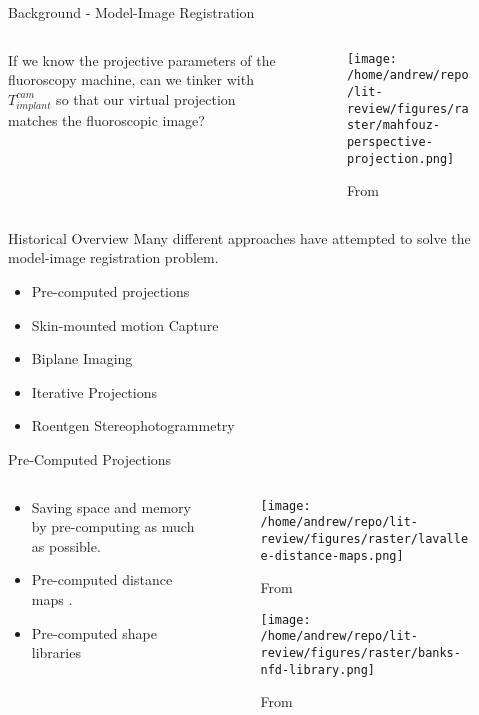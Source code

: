 \documentclass[presentation, aspectratio=1610]{beamer}
\begin{document}
\begin{frame}[label={sec:org9a68a46}]{Background - Model-Image Registration}
\begin{columns}
\begin{column}{0.5\columnwidth}
If we know the projective parameters of the fluoroscopy machine, can we tinker with \(T^{cam}_{implant}\) so that our virtual projection matches the fluoroscopic image?
\end{column}
\begin{column}{0.6\columnwidth}
\begin{figure}[htbp]
\centering
\texttt{[image: /home/andrew/repo/lit-review/figures/raster/mahfouz-perspective-projection.png]}
\caption{From \autocite{mahfouzRobustMethodRegistration2003}}
\end{figure}
\end{column}
\end{columns}
\end{frame}
\begin{frame}[label={sec:orgee687ed}]{Historical Overview}
Many different approaches have attempted to solve the model-image registration problem.
\begin{itemize}
\item Pre-computed projections
\item Skin-mounted motion Capture
\item Biplane Imaging
\item Iterative Projections
\item Roentgen Stereophotogrammetry
\end{itemize}
\end{frame}
\begin{frame}[label={sec:org7b996f5}]{Pre-Computed Projections}
\begin{columns}
\begin{column}{0.5\columnwidth}
\begin{itemize}
\item Saving space and memory by pre-computing as much as possible.
\item Pre-computed distance maps \autocites{zuffiModelbasedMethodReconstruction1999}[][]{lavalleeRecoveringPositionOrientation1995}.
\item Pre-computed shape libraries \autocite{banksAccurateMeasurementThreedimensional1996}
\end{itemize}
\end{column}
\begin{column}{0.6\columnwidth}
\begin{figure}[htbp]
\centering
\texttt{[image: /home/andrew/repo/lit-review/figures/raster/lavallee-distance-maps.png]}
\caption{From \autocite{lavalleeRecoveringPositionOrientation1995}}
\end{figure}
\vspace{-0.25in}
\begin{figure}[htbp]
\centering
\texttt{[image: /home/andrew/repo/lit-review/figures/raster/banks-nfd-library.png]}
\caption{From \autocite{banksAccurateMeasurementThreedimensional1996}}
\end{figure}
\end{column}
\end{columns}
\end{frame}
\end{document}
